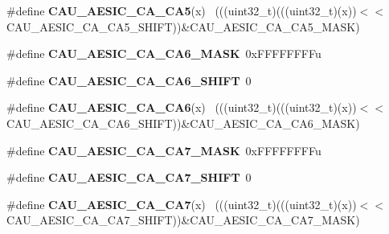 \begin{DoxyCompactItemize}
\item 
\hypertarget{group___c_a_u___register___masks_ga4c7f398cf047bde9b3f10f1402bf6abf}{}\#define {\bfseries C\+A\+U\+\_\+\+A\+E\+S\+I\+C\+\_\+\+C\+A\+\_\+\+C\+A5}(x)                                        ~(((uint32\+\_\+t)(((uint32\+\_\+t)(x))$<$$<$C\+A\+U\+\_\+\+A\+E\+S\+I\+C\+\_\+\+C\+A\+\_\+\+C\+A5\+\_\+\+S\+H\+I\+F\+T))\&C\+A\+U\+\_\+\+A\+E\+S\+I\+C\+\_\+\+C\+A\+\_\+\+C\+A5\+\_\+\+M\+A\+S\+K)\label{group___c_a_u___register___masks_ga4c7f398cf047bde9b3f10f1402bf6abf}

\item 
\hypertarget{group___c_a_u___register___masks_ga54d6732429da2f76aaca8e48c1f24a65}{}\#define {\bfseries C\+A\+U\+\_\+\+A\+E\+S\+I\+C\+\_\+\+C\+A\+\_\+\+C\+A6\+\_\+\+M\+A\+S\+K}~0x\+F\+F\+F\+F\+F\+F\+F\+Fu\label{group___c_a_u___register___masks_ga54d6732429da2f76aaca8e48c1f24a65}

\item 
\hypertarget{group___c_a_u___register___masks_ga69a702861a7ada57557747440c673f2f}{}\#define {\bfseries C\+A\+U\+\_\+\+A\+E\+S\+I\+C\+\_\+\+C\+A\+\_\+\+C\+A6\+\_\+\+S\+H\+I\+F\+T}~0\label{group___c_a_u___register___masks_ga69a702861a7ada57557747440c673f2f}

\item 
\hypertarget{group___c_a_u___register___masks_gadf10411f8f1b8781e8912d52f7a53d6b}{}\#define {\bfseries C\+A\+U\+\_\+\+A\+E\+S\+I\+C\+\_\+\+C\+A\+\_\+\+C\+A6}(x)                                        ~(((uint32\+\_\+t)(((uint32\+\_\+t)(x))$<$$<$C\+A\+U\+\_\+\+A\+E\+S\+I\+C\+\_\+\+C\+A\+\_\+\+C\+A6\+\_\+\+S\+H\+I\+F\+T))\&C\+A\+U\+\_\+\+A\+E\+S\+I\+C\+\_\+\+C\+A\+\_\+\+C\+A6\+\_\+\+M\+A\+S\+K)\label{group___c_a_u___register___masks_gadf10411f8f1b8781e8912d52f7a53d6b}

\item 
\hypertarget{group___c_a_u___register___masks_ga7e45df90e65bd21902c9c393b10d9320}{}\#define {\bfseries C\+A\+U\+\_\+\+A\+E\+S\+I\+C\+\_\+\+C\+A\+\_\+\+C\+A7\+\_\+\+M\+A\+S\+K}~0x\+F\+F\+F\+F\+F\+F\+F\+Fu\label{group___c_a_u___register___masks_ga7e45df90e65bd21902c9c393b10d9320}

\item 
\hypertarget{group___c_a_u___register___masks_gade98ca14bc2fb9d1b02a074073edcf82}{}\#define {\bfseries C\+A\+U\+\_\+\+A\+E\+S\+I\+C\+\_\+\+C\+A\+\_\+\+C\+A7\+\_\+\+S\+H\+I\+F\+T}~0\label{group___c_a_u___register___masks_gade98ca14bc2fb9d1b02a074073edcf82}

\item 
\hypertarget{group___c_a_u___register___masks_gaec4677836ee87d5c32b5c102ba93cfd0}{}\#define {\bfseries C\+A\+U\+\_\+\+A\+E\+S\+I\+C\+\_\+\+C\+A\+\_\+\+C\+A7}(x)                                        ~(((uint32\+\_\+t)(((uint32\+\_\+t)(x))$<$$<$C\+A\+U\+\_\+\+A\+E\+S\+I\+C\+\_\+\+C\+A\+\_\+\+C\+A7\+\_\+\+S\+H\+I\+F\+T))\&C\+A\+U\+\_\+\+A\+E\+S\+I\+C\+\_\+\+C\+A\+\_\+\+C\+A7\+\_\+\+M\+A\+S\+K)\label{group___c_a_u___register___masks_gaec4677836ee87d5c32b5c102ba93cfd0}


\end{DoxyCompactItemize}
